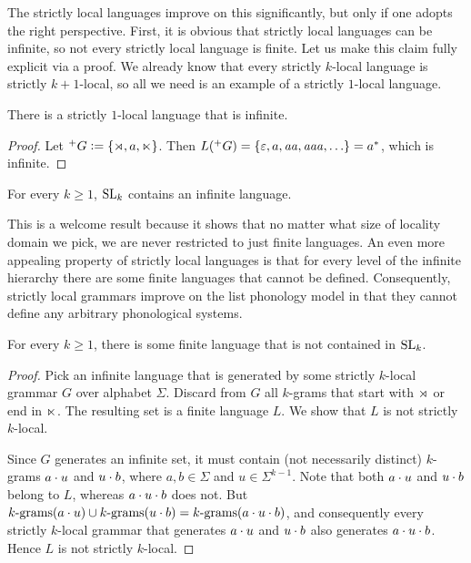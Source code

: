 The strictly local languages improve on this significantly, but only if one adopts the right perspective.
First, it is obvious that strictly local languages can be infinite, so not every strictly local language is finite.
Let us make this claim fully explicit via a proof.
We already know that every strictly $k$-local language is strictly $k+1$-local, so all we need is an example of a strictly $1$-local language.

%
\begin{lemma}
    There is a strictly $1$-local language that is infinite.
\end{lemma}
%
\begin{proof}
    Let $\posG{G} \is \setof{\LeftEdge, a, \RightEdge}$.
    Then $L(\posG{G}) = \setof{\emptystring, a, \String{aa}, \String{aaa}, \ldots} = a^*$, which is infinite.
\end{proof}
%
\begin{theorem}
    For every $k \geq 1$, $\SL_k$ contains an infinite language.
\end{theorem}
%
This is a welcome result because it shows that no matter what size of locality domain we pick, we are never restricted to just finite languages.
An even more appealing property of strictly local languages is that for every level of the infinite hierarchy there are some finite languages that cannot be defined.
Consequently, strictly local grammars improve on the list phonology model in that they cannot define any arbitrary phonological systems.
%
\begin{theorem}
    For every $k \geq 1$, there is some finite language that is not contained in $\SL_k$. 
\end{theorem}
%
\begin{proof}
    Pick an infinite language that is generated by some strictly $k$-local grammar $G$ over alphabet $\Sigma$.
    Discard from $G$ all $k$-grams that start with $\LeftEdge$ or end in $\RightEdge$.
    The resulting set is a finite language $L$.
    We show that $L$ is not strictly $k$-local.

    Since $G$ generates an infinite set, it must contain (not necessarily distinct) $k$-grams $a \stringcat u$ and $u \stringcat b$, where $a,b \in \Sigma$ and $u \in \Sigma^{k-1}$.
    Note that both $a \stringcat u$ and $u \stringcat b$ belong to $L$, whereas $a \stringcat u \stringcat b$ does not.
    But $\Bigrams[k](a \stringcat u) \cup \Bigrams[k](u \stringcat b) = \Bigrams[k](a \stringcat u \stringcat b)$, and consequently every strictly $k$-local grammar that generates $a \stringcat u$ and $u \stringcat b$ also generates $a \stringcat u \stringcat b$.
    Hence $L$ is not strictly $k$-local.
\end{proof}
